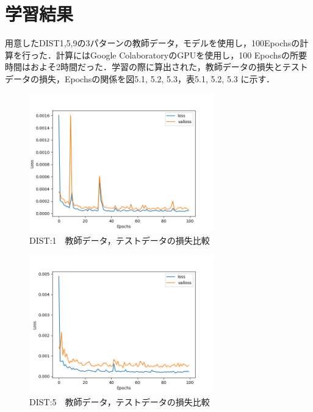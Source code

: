 \documentclass{jreport}		%
\begin{document}
\section{学習結果}
用意したDIST1,5,9の3パターンの教師データ，モデルを使用し，100Epochsの計算を行った．計算にはGoogle ColaboratoryのGPUを使用し，100 Epochsの所要時間はおよそ2時間だった．学習の際に算出された，教師データの損失とテストデータの損失，Epochsの関係を図5.1, 5.2, 5.3，表5.1, 5.2, 5.3 に示す．
\begin{figure}[htbp]
 \begin{center}
  \includegraphics[width=80mm]{gain1_loss_hikaku.png}
 \end{center}
 \caption{DIST:1　教師データ，テストデータの損失比較}
 \label{fig:one}
\end{figure}

\begin{figure}[htbp]
 \begin{center}
  \includegraphics[width=80mm]{gain5_loss_hikaku.png}
 \end{center}
 \caption{DIST:5　教師データ，テストデータの損失比較}
 \label{fig:one}
\end{figure}
\end{document}
